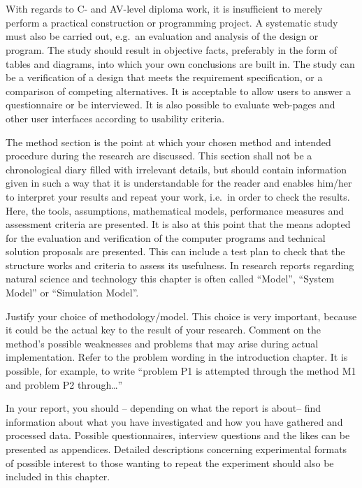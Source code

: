\section{}\label{sec:method}
With regards to C- and AV-level diploma work, it is insufficient to merely
perform a practical construction or programming project. A systematic study must
also be carried out, e.g.\ an evaluation and analysis of the design or program.
The study should result in objective facts, preferably in the form of tables and
diagrams, into which your own conclusions are built in. The study can be a
verification of a design that meets the requirement specification, or a
comparison of competing alternatives. It is acceptable to allow users to answer
a questionnaire or be interviewed. It is also possible to evaluate web-pages and
other user interfaces according to usability criteria.

The method section is the point at which your chosen method and intended
procedure during the research are discussed. This section shall not be a
chronological diary filled with irrelevant details, but should contain
information given in such a way that it is understandable for the reader and
enables him/her to interpret your results and repeat your work, i.e.\ in order to
check the results. Here, the tools, assumptions, mathematical models,
performance measures and assessment criteria are presented. It is also at this
point that the means adopted for the evaluation and verification of the computer
programs and technical solution proposals are presented. This can include a test
plan to check that the structure works and criteria to assess its usefulness. In
research reports regarding natural science and technology this chapter is often
called ``Model'', ``System Model'' or ``Simulation Model''.

Justify your choice of methodology/model. This choice is very important, because
it could be the actual key to the result of your research. Comment on the
method's possible weaknesses and problems that may arise during actual
implementation. Refer to the problem wording in the introduction chapter. It is
possible, for example, to write ``problem P1 is attempted through the method M1
and problem P2 through\dots''

In your report, you should – depending on what the report is about– find
information about what you have investigated and how you have gathered and
processed data. Possible questionnaires, interview questions and the likes can
be presented as appendices. Detailed descriptions concerning experimental
formats of possible interest to those wanting to repeat the experiment should
also be included in this chapter.

